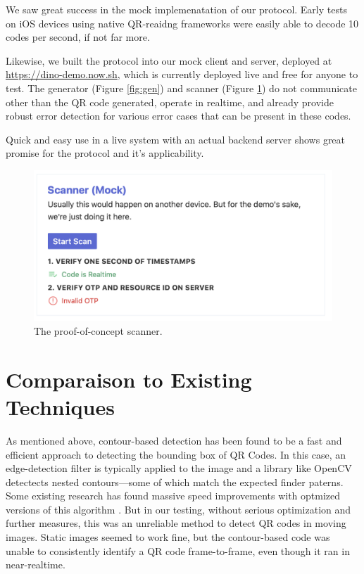 \documentclass[10pt,twocolumn,letterpaper]{article}
\begin{document}
We saw great success in the mock implemenatation of our protocol. Early tests on iOS devices using native QR-reaidng frameworks were easily able to decode 10 codes per second, if not far more.

Likewise, we built the protocol into our mock client and server, deployed at \url{https://dino-demo.now.sh}, which is currently deployed live and free for anyone to test. The generator (Figure \ref{fig:gen}) and scanner (Figure \ref{fig:scan}) do not communicate other than the QR code generated, operate in realtime, and already provide robust error detection for various error cases that can be present in these codes.

Quick and easy use in a live system with an actual backend server shows great promise for the protocol and it's applicability.

\begin{figure}[t]
   \begin{center}
      \includegraphics[width=0.8\linewidth]{scan.png}
   \end{center}
      \caption{The proof-of-concept scanner.}
   \label{fig:scan}
\end{figure}

\section{Comparaison to Existing Techniques}

As mentioned above, contour-based detection has been found to be a fast and efficient approach to detecting the bounding box of QR Codes. In this case, an edge-detection filter is typically applied to the image and a library like OpenCV detectects nested contours—some of which match the expected finder paterns. Some existing research has found massive speed improvements with optmized versions of this algorithm \cite{tong_qr_2014}. But in our testing, without serious optimization and further measures, this was an unreliable method to detect QR codes in moving images. Static images seemed to work fine, but the contour-based code was unable to consistently identify a QR code frame-to-frame, even though it ran in near-realtime.



{\small


}
\end{document}
